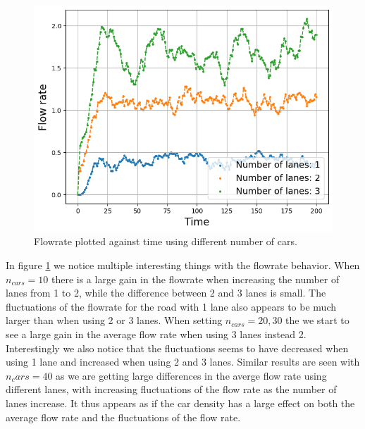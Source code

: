 \documentclass[a4paper,12pt]{article}
\begin{document}
\begin{figure}[H]
\begin{minipage}{.5\textwidth}
    \end{minipage}
    \centering
    \begin{minipage}{.5\textwidth}
        \centering
        \includegraphics[scale=0.47]{Images/flowrate time 50 cars.png}
    \end{minipage}%
    \caption{Flowrate plotted against time using different number of cars.}
    \label{flowrate}
\end{figure}
In figure \ref*{flowrate} we notice multiple interesting things with the flowrate behavior. When $n_{cars}=10$ there is a large gain in the flowrate when increasing
the number of lanes from 1 to 2, while the difference between 2 and 3 lanes is small. The fluctuations of the flowrate for the road with 1 lane also
appears to be much larger than when using 2 or 3 lanes. When setting $n_{cars}=20, 30$ the we start to see a large gain in the average flow rate when using 3 lanes instead 2.
Interestingly we also notice that the fluctuations seems to have decreased when using 1 lane and increased when using 2 and 3 lanes. Similar results are seen with $n_cars = 40$
as we are getting large differences in the averge flow rate using different lanes, with increasing fluctuations of the flow rate as the number of lanes increase.
It thus appears as if the car density has a large effect on both the average flow rate and the fluctuations of the flow rate.
\end{document}
